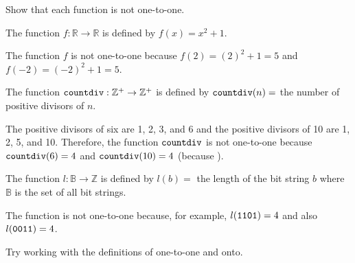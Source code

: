 \begin{exam}
\label{exam_onetoone}
    Show that each function is not one-to-one.
    \begin{apart}
        \item The function $f:\mathbb{R} \to \mathbb{R}$ is defined by $f(x) = x^2+1$.
            \begin{soln}
                The function $f$ is not one-to-one because $f(2) = (2)^2+1 = 5$  and $f(-2) = (-2)^2+1 =5$.
            \end{soln}    
        \item The function $\texttt{countdiv}: \mathbb{Z}^+ \to \mathbb{Z}^+$ is defined by $\texttt{countdiv}(n)=$ the number of positive divisors of $n$.
            \begin{soln}
                The positive divisors of six are 1, 2, 3, and 6 and the positive divisors of 10 are 1, 2, 5, and 10.  Therefore, the function $\texttt{countdiv}$ is not one-to-one because $\texttt{countdiv}(6) = 4$ and $\texttt{countdiv}(10) = 4$ 
                (because ).
            \end{soln}
        \item The function $l:\mathbb{B} \to \mathbb{Z}$ is defined by $l(b) =$ the length of the bit string $b$ where $\mathbb{B}$ is the set of all bit strings. 
           \begin{soln}
               The function is not one-to-one because, for example, $l(\texttt{1101})=4$ and also $l(\texttt{0011})=4$.
           \end{soln}
    \end{apart}
\end{exam} 

Try working with the definitions of one-to-one and onto.

